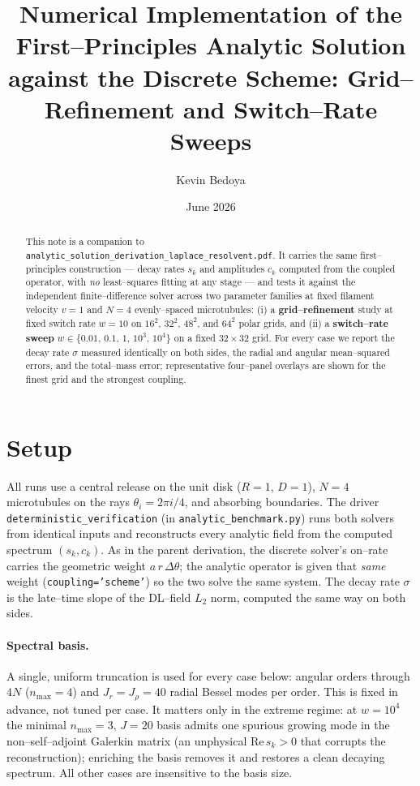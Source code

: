 \documentclass{article}
\title{Numerical Implementation of the First--Principles Analytic Solution\\
against the Discrete Scheme: Grid--Refinement and Switch--Rate Sweeps}
\author{Kevin Bedoya}
\date{June 2026}
\begin{document}
\maketitle

\begin{abstract}
This note is a companion to \texttt{analytic\_solution\_derivation\_laplace\_resolvent.pdf}.
It carries the same first--principles construction --- decay rates $s_k$ and
amplitudes $c_k$ computed from the coupled operator, with \emph{no} least--squares
fitting at any stage --- and tests it against the independent finite--difference
solver across two parameter families at fixed filament velocity $v=1$ and $N=4$
evenly--spaced microtubules: (i) a \textbf{grid--refinement} study at fixed switch
rate $w=10$ on $16^2$, $32^2$, $48^2$, and $64^2$ polar grids, and (ii) a
\textbf{switch--rate sweep} $w\in\{0.01,\,0.1,\,1,\,10^3,\,10^4\}$ on a fixed
$32\times32$ grid. For every case we report the decay rate $\sigma$ measured
identically on both sides, the radial and angular mean--squared errors, and the
total--mass error; representative four--panel overlays are shown for the finest
grid and the strongest coupling.
\end{abstract}

\section{Setup}
All runs use a central release on the unit disk ($R=1$, $D=1$), $N=4$
microtubules on the rays $\theta_i=2\pi i/4$, and absorbing boundaries. The
driver \texttt{deterministic\_verification} (in \texttt{analytic\_benchmark.py})
runs both solvers from identical inputs and reconstructs every analytic field
from the computed spectrum $(s_k,c_k)$. As in the parent derivation, the discrete
solver's on--rate carries the geometric weight $a\,r\,\Delta\theta$; the analytic
operator is given that \emph{same} weight (\texttt{coupling='scheme'}) so the two
solve the same system. The decay rate $\sigma$ is the late--time slope of the
DL--field $L_2$ norm, computed the same way on both sides.

\paragraph{Spectral basis.} A single, uniform truncation is used for every case
below: angular orders through $4N$ ($n_{\max}=4$) and $J_r=J_\rho=40$ radial
Bessel modes per order. This is fixed in advance, not tuned per case. It matters
only in the extreme regime: at $w=10^4$ the minimal $n_{\max}=3,\,J=20$ basis
admits one spurious growing mode in the non--self--adjoint Galerkin matrix (an
unphysical $\mathrm{Re}\,s_k>0$ that corrupts the reconstruction); enriching the
basis removes it and restores a clean decaying spectrum. All other cases are
insensitive to the basis size.
\end{document}
